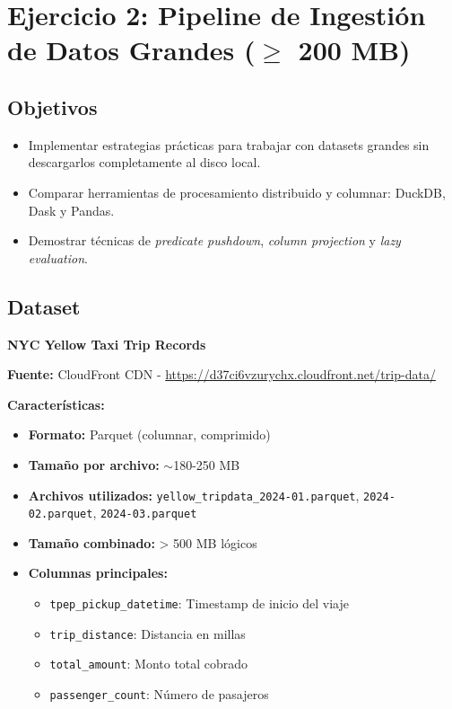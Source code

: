 \documentclass[12pt]{src/formato_utem}
\begin{document}
\newpage

\section{Ejercicio 2: Pipeline de Ingestión de Datos Grandes ($\geq$ 200 MB)}

\subsection{Objetivos}

\begin{itemize}
    \item Implementar estrategias prácticas para trabajar con datasets grandes sin descargarlos completamente al disco local.
    \item Comparar herramientas de procesamiento distribuido y columnar: DuckDB, Dask y Pandas.
    \item Demostrar técnicas de \textit{predicate pushdown}, \textit{column projection} y \textit{lazy evaluation}.
\end{itemize}

\subsection{Dataset}

\textbf{NYC Yellow Taxi Trip Records}

\textbf{Fuente:} CloudFront CDN - \url{https://d37ci6vzurychx.cloudfront.net/trip-data/}

\textbf{Características:}
\begin{itemize}
    \item \textbf{Formato:} Parquet (columnar, comprimido)
    \item \textbf{Tamaño por archivo:} $\sim$180-250 MB
    \item \textbf{Archivos utilizados:} \texttt{yellow\_tripdata\_2024-01.parquet}, \texttt{2024-02.parquet}, \texttt{2024-03.parquet}
    \item \textbf{Tamaño combinado:} > 500 MB lógicos
    \item \textbf{Columnas principales:}
    \begin{itemize}
        \item \texttt{tpep\_pickup\_datetime}: Timestamp de inicio del viaje
        \item \texttt{trip\_distance}: Distancia en millas
        \item \texttt{total\_amount}: Monto total cobrado
        \item \texttt{passenger\_count}: Número de pasajeros
    \end{itemize}
\end{itemize}
\end{document}
